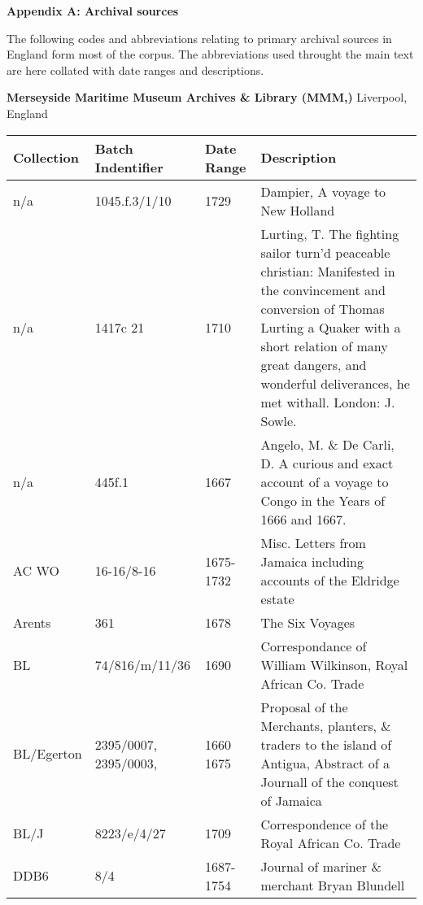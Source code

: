 \clearpage\begin{styleStandard}
\textbf{Appendix A: Archival sources}
\end{styleStandard}

\begin{styleStandard}
The following codes and abbreviations relating to primary archival sources in England form most of the corpus. The abbreviations used throught the main text are here collated with date ranges and descriptions. 
\end{styleStandard}

\begin{styleStandard}
\textbf{Merseyside Maritime Museum Archives \& Library (MMM,)} Liverpool, England
\end{styleStandard}

\begin{flushleft}
\tablefirsthead{}
\tablehead{}
\tabletail{}
\tablelasttail{}
\begin{supertabular}{|m{0.8670598in}|m{1.4830599in}|m{0.8830598in}|m{2.4629598in}|}
\hline
\textbf{Collection} &
\textbf{Batch Indentifier}\footnotemark{} &
\textbf{Date Range} &
\textbf{Description}\\\hline
n/a &
1045.f.3/1/10 \  &
1729 &
Dampier, A voyage to New Holland\\\hline
n/a &
1417c 21 &
1710 &
Lurting, T. The fighting sailor turn’d peaceable christian: Manifested in the convincement and conversion of Thomas Lurting a Quaker with a short relation of many great dangers, and wonderful deliverances, he met withall. London: J. Sowle.\\\hline
n/a &
445f.1 &
1667 &
Angelo, M. \& De Carli, D. A curious and exact account of a voyage to Congo in the Years of 1666 and 1667.\\\hline
AC WO &
16-16/8-16 &
1675-1732 &
Misc. Letters from Jamaica including accounts of the Eldridge estate\\\hline
Arents &
361 &
1678 &
The Six Voyages\\\hline
BL &
74/816/m/11/36 &
1690 &
Correspondance of William Wilkinson, Royal African Co. Trade\\\hline
BL/Egerton &
2395/0007, 2395/0003,  &
1660 1675 &
Proposal of the Merchants, planters, \& traders to the island of Antigua, Abstract of a Journall of the conquest of Jamaica\\\hline
BL/J &
8223/e/4/27 &
1709 &
Correspondence of the Royal African Co. Trade\\\hline
DDB6  &
8/4 &
1687-1754 &
Journal of mariner \& merchant Bryan Blundell\\\hline

\end{supertabular}
\end{flushleft}
